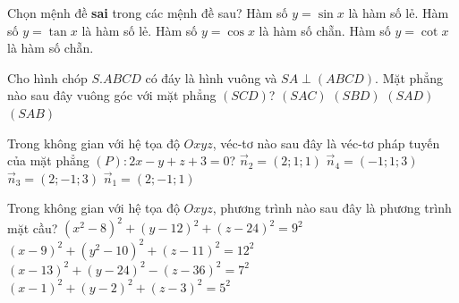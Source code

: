 \begin{ex}
	 Chọn mệnh đề \textbf{sai} trong các mệnh đề sau?
	\choice
	{ Hàm số $y = \sin x$ là hàm số lẻ.}
	{ Hàm số $y = \tan x$ là hàm số lẻ.}
	{ Hàm số $y = \cos x$ là hàm số chẵn.}
	{ \True Hàm số $y = \cot x$ là hàm số chẵn.}
\end{ex}

\begin{ex}
	 Cho hình chóp $S.ABCD$ có đáy là hình vuông và $SA \perp (ABCD)$. Mặt phẳng nào sau đây vuông góc với mặt phẳng $(SCD)$?
	\choice
	{ $(SAC)$}
	{ $(SBD)$}
	{ \True $(SAD)$}
	{ $(SAB)$}
\end{ex}

\begin{ex}
	 Trong không gian với hệ tọa độ $Oxyz$, véc-tơ nào sau đây là véc-tơ pháp tuyến của mặt phẳng $(P)\colon 2x - y + z + 3 = 0$?
	\choice
	{ $\vec{n}_2 = \left(2; 1; 1\right)$}
	{ $\vec{n}_4 = \left(-1; 1; 3\right)$}
	{ $\vec{n}_3 = \left(2; -1; 3\right)$}
	{ \True $\vec{n}_1 = \left(2; -1; 1\right)$}
\end{ex}

\begin{ex}
	 Trong không gian với hệ tọa độ $Oxyz$, phương trình nào sau đây là phương trình mặt cầu?
	\choice
	{ $(x^2 - 8)^2 + (y - 12)^2 + (z - 24)^2 = 9^2$}
	{ $(x - 9)^2 + (y^2 - 10)^2 + (z - 11)^2 = 12^2$}
	{ $(x - 13)^2 + (y - 24)^2 - (z - 36)^2 = 7^2$}
	{ \True $(x - 1)^2 + (y - 2)^2 + (z - 3)^2 = 5^2$}
\end{ex}


